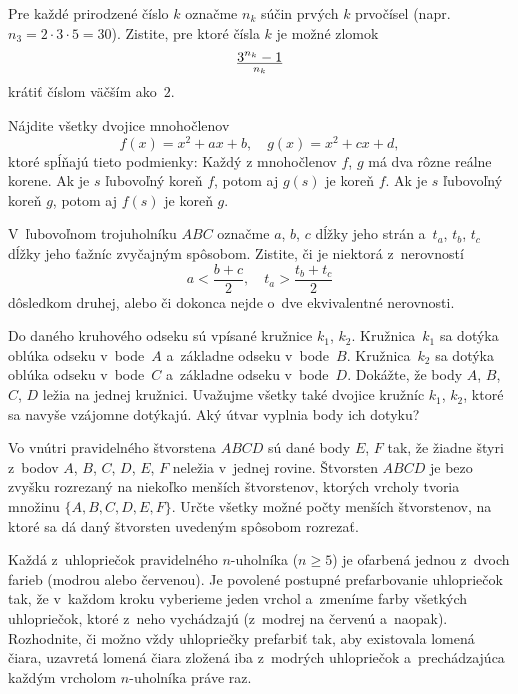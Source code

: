 ﻿{%
Pre každé prirodzené číslo $k$ označme $n_k$ súčin prvých $k$ prvočísel
(napr. $n_3=2\cdot3\cdot5=30$). Zistite, pre ktoré čísla $k$ je
možné zlomok
$$
3^{n_k}-1\over  n_k
$$
krátiť číslom väčším ako~$2$.}

{%
Nájdite všetky dvojice mnohočlenov
$$
f(x)=x^2+ax+b,\quad g(x)=x^2+cx+d,
$$
ktoré spĺňajú tieto podmienky:
 Každý z mnohočlenov $f$, $g$ má dva rôzne reálne korene.
 Ak je $s$ ľubovoľný koreň $f$, potom aj $g(s)$ je koreň $f$.
 Ak je $s$ ľubovoľný koreň $g$, potom aj $f(s)$ je koreň $g$.
\endgraf
}

{%
V~ľubovoľnom trojuholníku $ABC$ označme $a$, $b$, $c$ dĺžky jeho strán
a~$t_a$, $t_b$, $t_c$ dĺžky jeho ťažníc zvyčajným spôsobom.
Zistite, či je niektorá z~nerovností
$$
a<\frac{b+c}2, \quad t_a>\frac{t_b+t_c}2
$$
dôsledkom druhej, alebo či dokonca nejde o~dve ekvivalentné
nerovnosti.}

{%
Do daného kruhového odseku sú vpísané kružnice $k_1$, $k_2$. Kružnica~$k_1$ sa dotýka oblúka odseku v~bode~$A$ a~základne odseku v~bode~$B$.
Kružnica~$k_2$ sa dotýka oblúka odseku v~bode~$C$ a~základne odseku
v~bode~$D$.
 Dokážte, že body $A$, $B$, $C$, $D$ ležia na jednej kružnici.
 Uvažujme všetky také dvojice kružníc $k_1$, $k_2$,
ktoré sa navyše vzájomne dotýkajú. Aký útvar vyplnia body ich dotyku?
}

{%
Vo vnútri pravidelného štvorstena $ABCD$
sú dané body $E$, $F$ tak, že žiadne
štyri z~bodov $A$, $B$, $C$, $D$, $E$, $F$ neležia v~jednej rovine.
Štvorsten $ABCD$ je bezo zvyšku rozrezaný na niekoľko menších
štvorstenov, ktorých vrcholy tvoria množinu $\{A,B,C,D,E,F\}$. Určte
všetky možné počty menších štvorstenov, na ktoré sa dá daný štvorsten
uvedeným spôsobom rozrezať.}

{%
Každá z~uhlopriečok pravidelného $n$-uholníka ($n\ge5$) je ofarbená
jednou z~dvoch farieb (modrou alebo červenou). Je povolené postupné
prefarbovanie uhlopriečok tak, že v~každom kroku vyberieme jeden
vrchol a~zmeníme farby všetkých uhlopriečok, ktoré z~neho vychádzajú
(z~modrej na červenú a~naopak).  Rozhodnite, či možno vždy
uhlopriečky prefarbiť tak, aby existovala
 lomená čiara,
 uzavretá lomená čiara
\endgraf
\noindent
zložená iba z~modrých uhlopriečok a~prechádzajúca každým vrcholom
$n$-uholníka práve raz.
}

